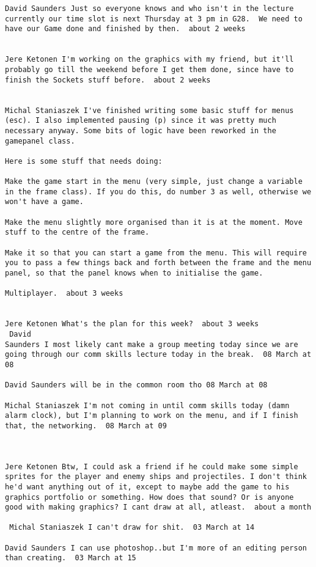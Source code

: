 \begin{verbatim}
David Saunders Just so everyone knows and who isn't in the lecture
currently our time slot is next Thursday at 3 pm in G28.  We need to
have our Game done and finished by then.  about 2 weeks 


Jere Ketonen I'm working on the graphics with my friend, but it'll
probably go till the weekend before I get them done, since have to
finish the Sockets stuff before.  about 2 weeks 


Michal Staniaszek I've finished writing some basic stuff for menus
(esc). I also implemented pausing (p) since it was pretty much
necessary anyway. Some bits of logic have been reworked in the
gamepanel class.

Here is some stuff that needs doing:

Make the game start in the menu (very simple, just change a variable
in the frame class). If you do this, do number 3 as well, otherwise we
won't have a game.

Make the menu slightly more organised than it is at the moment. Move
stuff to the centre of the frame.

Make it so that you can start a game from the menu. This will require
you to pass a few things back and forth between the frame and the menu
panel, so that the panel knows when to initialise the game.

Multiplayer.  about 3 weeks 


Jere Ketonen What's the plan for this week?  about 3 weeks 
 David
Saunders I most likely cant make a group meeting today since we are
going through our comm skills lecture today in the break.  08 March at
08

David Saunders will be in the common room tho 08 March at 08

Michal Staniaszek I'm not coming in until comm skills today (damn
alarm clock), but I'm planning to work on the menu, and if I finish
that, the networking.  08 March at 09



Jere Ketonen Btw, I could ask a friend if he could make some simple
sprites for the player and enemy ships and projectiles. I don't think
he'd want anything out of it, except to maybe add the game to his
graphics portfolio or something. How does that sound? Or is anyone
good with making graphics? I cant draw at all, atleast.  about a month

 Michal Staniaszek I can't draw for shit.  03 March at 14

David Saunders I can use photoshop..but I'm more of an editing person
than creating.  03 March at 15


\end{verbatim}
